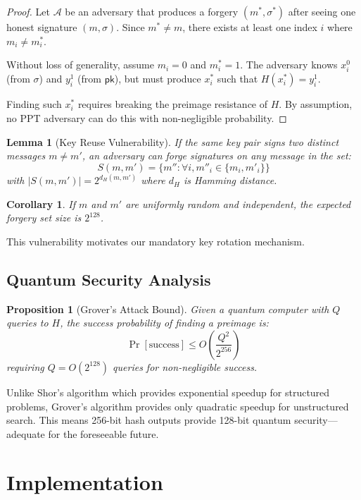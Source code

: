 \documentclass[11pt,a4paper]{article}
\newtheorem{lemma}{Lemma}
\newtheorem{corollary}{Corollary}
\newtheorem{proposition}{Proposition}
\begin{document}
\begin{proof}
Let $\mathcal{A}$ be an adversary that produces a forgery $(m^*, \sigma^*)$ after seeing one honest signature $(m, \sigma)$. Since $m^* \neq m$, there exists at least one index $i$ where $m_i \neq m^*_i$.

Without loss of generality, assume $m_i = 0$ and $m^*_i = 1$. The adversary knows $x_i^0$ (from $\sigma$) and $y_i^1$ (from $\mathsf{pk}$), but must produce $x^*_i$ such that $H(x^*_i) = y_i^1$.

Finding such $x^*_i$ requires breaking the preimage resistance of $H$. By assumption, no PPT adversary can do this with non-negligible probability.
\end{proof}

\begin{lemma}[Key Reuse Vulnerability]
If the same key pair signs two distinct messages $m \neq m'$, an adversary can forge signatures on any message in the set:
\[
S(m, m') = \{m'' : \forall i, m''_i \in \{m_i, m'_i\}\}
\]
with $|S(m, m')| = 2^{d_H(m, m')}$ where $d_H$ is Hamming distance.
\end{lemma}

\begin{corollary}
If $m$ and $m'$ are uniformly random and independent, the expected forgery set size is $2^{128}$.
\end{corollary}

This vulnerability motivates our mandatory key rotation mechanism.

\subsection{Quantum Security Analysis}

\begin{proposition}[Grover's Attack Bound]
Given a quantum computer with $Q$ queries to $H$, the success probability of finding a preimage is:
\[
\Pr[\text{success}] \leq O\left(\frac{Q^2}{2^{256}}\right)
\]
requiring $Q = O(2^{128})$ queries for non-negligible success.
\end{proposition}

Unlike Shor's algorithm which provides exponential speedup for structured problems, Grover's algorithm provides only quadratic speedup for unstructured search. This means 256-bit hash outputs provide 128-bit quantum security---adequate for the foreseeable future.

\section{Implementation}
\end{document}
